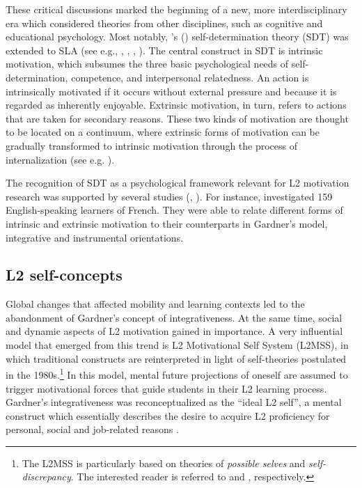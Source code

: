 \documentclass[output=paper]{langscibook}
\begin{document}
These critical discussions marked the beginning of a new, more interdisciplinary era which considered theories from other disciplines, such as cognitive and educational psychology. Most notably, \citeauthor{DeciRyan1985ErsterEintrag}'s (\citeyear{DeciRyan1985ErsterEintrag,DeciRyan2002}) self-de\-ter\-mi\-na\-tion theory (SDT) was extended to SLA (see e.g., \citealt{Doernyei1994}, \citealt{Dickinson1995}, \citealt{SchmidtEtAl1996}, \citealt{NoelsEtAl1999,NoelsEtAl2000}). The central construct in SDT is intrinsic motivation, which subsumes the three basic psychological needs of self-determination, competence, and interpersonal relatedness. An action is intrinsically motivated if it occurs without external pressure and because it is regarded as inherently enjoyable. Extrinsic motivation, in turn, refers to actions that are taken for secondary reasons. These two kinds of motivation are thought to be located on a continuum, where extrinsic forms of motivation can be gradually transformed to intrinsic motivation through the process of internalization (see e.g. \citealt{DeciRyan1985ErsterEIntrag}). 

The recognition of SDT as a psychological framework relevant for L2 motivation research was supported by several studies (\citealt{NoelsEtAl2000}, \citealt{Noels2001}). For instance, \citet[72--74]{NoelsEtAl2000} investigated 159 English-speaking learners of French. They were able to relate different forms of intrinsic and extrinsic motivation to their counterparts in Gardner’s model, integrative and instrumental orientations.

\subsection{L2 self-concepts} %

Global changes that affected mobility and learning contexts led to the abandonment of Gardner’s concept of integrativeness. At the same time, social and dynamic aspects of L2 motivation gained in importance. A very influential model that emerged from this trend is  L2 Motivational Self System (L2MSS), in which traditional constructs are reinterpreted in light of self-theories postulated in the 1980s.\footnote{The L2MSS is particularly based on theories of \textit{possible selves} and \textit{self-discrepancy}. The interested reader is referred to \citet{MarkusNurius1986} and \citet{Higgins1987}, respectively.} In this model, mental future projections of oneself are assumed to trigger motivational forces that guide students in their L2 learning process. Gardner’s integrativeness was reconceptualized as the “ideal L2 self”, a mental construct which essentially describes the desire to acquire L2 proficiency for personal, social and job-related reasons \citep{Doernyei2009}.
\end{document}
